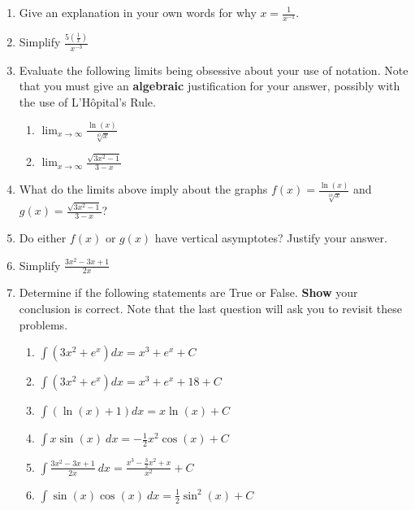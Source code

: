 \documentclass[12pt]{article}
\renewcommand{\emph}[1]{\textsf{\textbf{#1}}}
\newcommand{\ds}{\displaystyle}
\begin{document}
\begin{enumerate}
\item Give an explanation in your own words for why $x=\frac{1}{x^{-1}}.$\\
\vspace{.5in}

\item Simplify $\ds \frac{5 \left(\frac{1}{x}\right)}{x^{-3}}$\\
\vspace{.5in}

\item Evaluate the following limits being obsessive about your use of notation. Note that you must give an \textbf{algebraic} justification for your answer, possibly with the use of L'H\^{o}pital's Rule.
\begin{enumerate}
	\item $\displaystyle{\lim_{x \to \infty} \frac{\ln (x)}{\sqrt[10]{x}}}$\\
	\vfill
	\item $\displaystyle{\lim_{x \to \infty} \frac{\sqrt{3x^2-1}}{3-x}}$\\
	\vfill
\end{enumerate}
\item What do the limits above imply about the graphs $f(x) = \frac{\ln (x)}{\sqrt[10]{x}}$ and $g(x) = \frac{\sqrt{3x^2-1}}{3-x}$?
\vfill
\item Do either $f(x)$ or $g(x)$ have vertical asymptotes? Justify your answer.
\vfill
\newpage
\item Simplify $\displaystyle \frac{3x^2-3x+1}{2x}$\\
\item Determine if the following statements are True or False. \emph{Show} your conclusion is correct. Note that the last question will ask you to revisit these problems.
	\begin{enumerate}
	\item  $\displaystyle{\int (3x^2+e^x)dx=x^3+e^x+C}$
	\vfill
	\item  $\displaystyle{\int (3x^2+e^x)dx=x^3+e^x+18+C}$
	\vfill
	\item $\displaystyle{\int (\ln(x)+1)dx=x\ln(x)+C}$
	\vfill
	\item $\displaystyle{\int x \sin(x) \: dx = -\frac{1}{2}x^2 \cos(x)+C}$
	\vfill
	\item $\displaystyle{\int \frac{3x^2-3x+1}{2x} \: dx = \frac{x^3-\frac{3}{2}x^2+x}{x^2}+C}$
	\vfill
	\newpage
	\item $\displaystyle{\int \sin(x) \cos(x) \: dx = \frac{1}{2}\sin^2(x) +C}$

\end{enumerate}
\end{enumerate}
\end{document}
